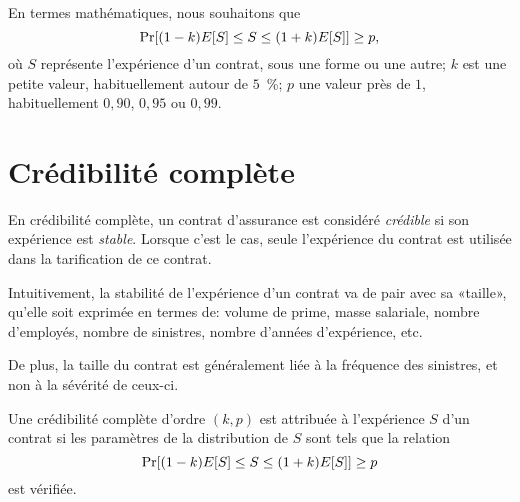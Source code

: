 En termes mathématiques, nous souhaitons que
\begin{equation*}
  \Pr[(1 - k) E [ S ] \leq S \leq (1 + k) E [ S ]] \geq p,
\end{equation*}
où $S$ représente l'expérience d'un contrat, sous une forme ou une
autre; $k$ est une petite valeur, habituellement autour de $5$~\%; $p$
une valeur près de $1$, habituellement $0,90$, $0,95$ ou $0,99$.


\section{Crédibilité complète}
\label{sec:stabilite:complete}

En crédibilité complète, un contrat d'assurance est considéré
\emph{crédible} si son expérience est \emph{stable}. Lorsque c'est le
cas, seule l'expérience du contrat est utilisée dans la tarification
de ce contrat.


Intuitivement, la stabilité de l'expérience d'un contrat va de pair
avec sa «taille», qu'elle soit exprimée en termes de: volume de prime,
masse salariale, nombre d'employés, nombre de sinistres, nombre
d'années d'expérience, etc.

De plus, la taille du contrat est généralement liée à la fréquence des
sinistres, et non à la sévérité de ceux-ci.

\begin{definition}
  \label{def:stabilite:complete}
  Une crédibilité complète d'ordre $(k, p)$ est attribuée à
  l'expérience $S$ d'un contrat si les paramètres de la distribution
  de $S$ sont tels que la relation
  \begin{equation*}
    \Pr[(1 - k) E [ S ] \leq S \leq (1 + k) E [ S ]] \geq p
  \end{equation*}
  est vérifiée.
\end{definition}

